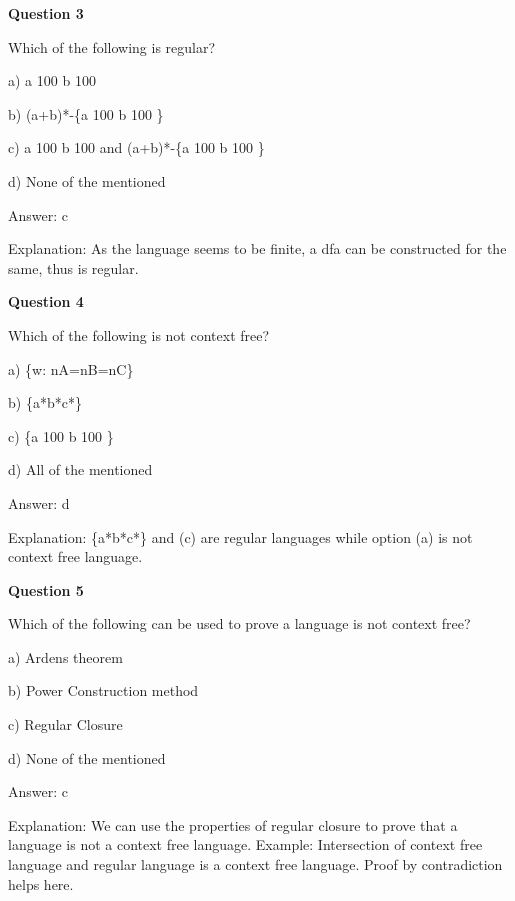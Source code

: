 \documentclass{article}
\begin{document}
\begin{mdframed}[linewidth=1pt, roundcorner=5pt, linecolor=gray!30, backgroundcolor=gray!5]
\textbf{Question 3} 

Which of the following is regular?

a) a
100
b
100

b) (a+b)*-\{a
100
b
100
\}

c) a
100
b
100
 and (a+b)*-\{a
100
b
100
\}

d) None of the mentioned
\vspace{5pt} \par
\begin{tcolorbox}[colback=green!5, colframe=green!40!black, title=Solution]
Answer: c

Explanation: As the language seems to be finite, a dfa can be constructed for the same, thus is regular.
\end{tcolorbox}
\end{mdframed}
\newpage

\begin{mdframed}[linewidth=1pt, roundcorner=5pt, linecolor=gray!30, backgroundcolor=gray!5]
\textbf{Question 4} 

Which of the following is not context free?

a) \{w: nA=nB=nC\}

b) \{a*b*c*\}

c) \{a
100
b
100
\}

d) All of the mentioned
\vspace{5pt} \par
\begin{tcolorbox}[colback=green!5, colframe=green!40!black, title=Solution]
Answer: d

Explanation: \{a*b*c*\} and (c) are regular languages while option (a) is not context free language.
\end{tcolorbox}
\end{mdframed}

\begin{mdframed}[linewidth=1pt, roundcorner=5pt, linecolor=gray!30, backgroundcolor=gray!5]
\textbf{Question 5} 

Which of the following can be used to prove a language is not context free?

a) Ardens theorem

b) Power Construction method

c) Regular Closure

d) None of the mentioned
\vspace{5pt} \par
\begin{tcolorbox}[colback=green!5, colframe=green!40!black, title=Solution]
Answer: c

Explanation: We can use the properties of regular closure to prove that a language is not a context free language. Example: Intersection of context free language and regular language is a context free language. Proof by contradiction helps here.
\end{tcolorbox}
\end{mdframed}
\end{document}
